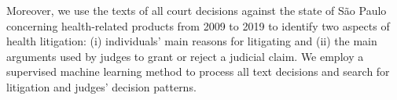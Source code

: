 Moreover, we use the texts of all court decisions against the state of São Paulo concerning health-related products from 2009 to 2019 to identify two aspects of health litigation: (i) individuals’ main reasons for litigating and (ii) the main arguments used by judges to grant or reject a judicial claim. We employ a supervised machine learning method to process all text decisions and search for litigation and judges’ decision patterns.
